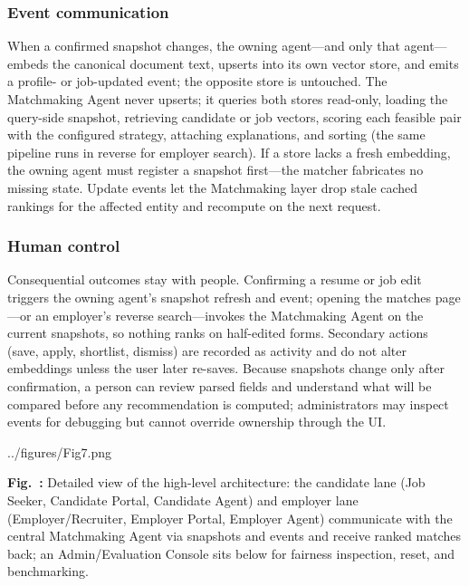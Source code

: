 \subsubsection{Event communication}\label{sec:3-events}
When a confirmed snapshot changes, the owning agent---and only that agent---embeds the canonical document text, upserts into its own vector store, and emits a profile- or job-updated event; the opposite store is untouched.
The Matchmaking Agent never upserts; it queries both stores read-only, loading the query-side snapshot, retrieving candidate or job vectors, scoring each feasible pair with the configured strategy, attaching explanations, and sorting (the same pipeline runs in reverse for employer search).
If a store lacks a fresh embedding, the owning agent must register a snapshot first---the matcher fabricates no missing state.
Update events let the Matchmaking layer drop stale cached rankings for the affected entity and recompute on the next request.

\subsubsection{Human control}\label{sec:3-human}
Consequential outcomes stay with people.
Confirming a resume or job edit triggers the owning agent's snapshot refresh and event; opening the matches page---or an employer's reverse search---invokes the Matchmaking Agent on the current snapshots, so nothing ranks on half-edited forms.
Secondary actions (save, apply, shortlist, dismiss) are recorded as activity and do not alter embeddings unless the user later re-saves.
Because snapshots change only after confirmation, a person can review parsed fields and understand what will be compared before any recommendation is computed; administrators may inspect events for debugging but cannot override ownership through the UI.

\begin{JFigure}{../figures/Fig7.png}
\vspace{1\baselineskip}
\label{fig:7}
\par\smallskip\noindent\textbf{Fig.~\thefigure:} Detailed view of the high-level architecture: the candidate lane (Job Seeker, Candidate Portal, Candidate Agent) and employer lane (Employer/Recruiter, Employer Portal, Employer Agent) communicate with the central Matchmaking Agent via snapshots and events and receive ranked matches back; an Admin/Evaluation Console sits below for fairness inspection, reset, and benchmarking.
\end{JFigure}

